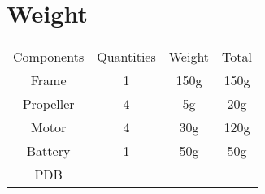     \section{Weight}
        \centering
        \begin{tabular}{cccc}
            Components & Quantities & Weight & Total \\
            Frame & 1 & 150g & 150g \\
            Propeller & 4 & 5g & 20g \\
            Motor & 4 & 30g & 120g \\
            Battery & 1 & 50g & 50g \\
            PDB 
        \end{tabular}